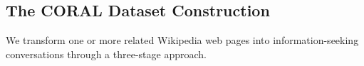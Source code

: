 \documentclass[11pt]{article}
\begin{document}







\subsection{The CORAL Dataset Construction}
We transform one or more related Wikipedia web pages into information-seeking conversations through a three-stage approach.
\end{document}
